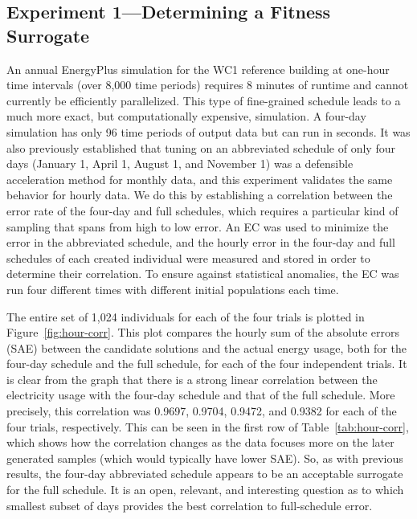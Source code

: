 \documentclass[preprint, review, 12pt]{elsarticle}
\begin{document}
\subsection{Experiment 1---Determining a Fitness Surrogate}
\label{sub:experiment1}
An annual EnergyPlus simulation for the WC1 reference building at one-hour time intervals (over 8,000 time periods) requires 8 minutes of runtime and cannot currently be efficiently parallelized. This type of fine-grained schedule leads to a much more exact, but computationally expensive, simulation. A four-day simulation has only 96 time periods of output data but can run in seconds. It was also previously established \cite{cit:garrett2013} that tuning on an abbreviated schedule of only four days (January 1, April 1, August 1, and November 1) was a defensible acceleration method for monthly data, and this experiment validates the same behavior for hourly data. We do this by establishing a correlation between the error rate of the four-day and full schedules, which requires a particular kind of sampling that spans from high to low error. An EC was used to minimize the error in the abbreviated schedule, and the hourly error in the four-day and full schedules of each created individual were measured and stored in order to determine their correlation. To ensure against statistical anomalies, the EC was run four different times with different initial populations each time.

The entire set of 1,024 individuals for each of the four trials is plotted in Figure~\ref{fig:hour-corr}. This plot compares the hourly sum of the absolute errors (SAE) between the candidate solutions and the actual energy usage, both for the four-day schedule and the full schedule, for each of the four independent trials. It is clear from the graph that there is a strong linear correlation between the electricity usage with the four-day schedule and that of the full schedule. More precisely, this correlation was 0.9697, 0.9704, 0.9472, and 0.9382 for each of the four trials, respectively. This can be seen in the first row of Table~\ref{tab:hour-corr}, which shows how the correlation changes as the data focuses more on the later generated samples (which would typically have lower SAE). So, as with previous results, the four-day abbreviated schedule appears to be an acceptable surrogate for the full schedule. It is an open, relevant, and interesting question as to which smallest subset of days provides the best correlation to full-schedule error.
\end{document}
